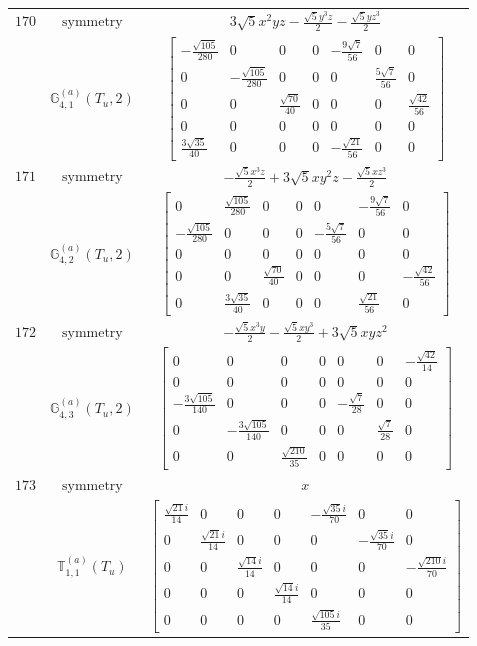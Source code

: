 \documentclass[fleqn,8pt,landscape]{jsarticle}
\begin{document}
\begin{longtable}{ccc}
$ 170 $ & $ \text{symmetry} $ & $ 3 \sqrt{5} x^{2} y z - \frac{\sqrt{5} y^{3} z}{2} - \frac{\sqrt{5} y z^{3}}{2} $ \\
$  $ & $ \mathbb{G}_{4,1}^{(a)}(T_{u},2) $ & $ \begin{bmatrix} - \frac{\sqrt{105}}{280} & 0 & 0 & 0 & - \frac{9 \sqrt{7}}{56} & 0 & 0 \\ 0 & - \frac{\sqrt{105}}{280} & 0 & 0 & 0 & \frac{5 \sqrt{7}}{56} & 0 \\ 0 & 0 & \frac{\sqrt{70}}{40} & 0 & 0 & 0 & \frac{\sqrt{42}}{56} \\ 0 & 0 & 0 & 0 & 0 & 0 & 0 \\ \frac{3 \sqrt{35}}{40} & 0 & 0 & 0 & - \frac{\sqrt{21}}{56} & 0 & 0 \end{bmatrix} $ \\ \hline
$ 171 $ & $ \text{symmetry} $ & $ - \frac{\sqrt{5} x^{3} z}{2} + 3 \sqrt{5} x y^{2} z - \frac{\sqrt{5} x z^{3}}{2} $ \\
$  $ & $ \mathbb{G}_{4,2}^{(a)}(T_{u},2) $ & $ \begin{bmatrix} 0 & \frac{\sqrt{105}}{280} & 0 & 0 & 0 & - \frac{9 \sqrt{7}}{56} & 0 \\ - \frac{\sqrt{105}}{280} & 0 & 0 & 0 & - \frac{5 \sqrt{7}}{56} & 0 & 0 \\ 0 & 0 & 0 & 0 & 0 & 0 & 0 \\ 0 & 0 & \frac{\sqrt{70}}{40} & 0 & 0 & 0 & - \frac{\sqrt{42}}{56} \\ 0 & \frac{3 \sqrt{35}}{40} & 0 & 0 & 0 & \frac{\sqrt{21}}{56} & 0 \end{bmatrix} $ \\ \hline
$ 172 $ & $ \text{symmetry} $ & $ - \frac{\sqrt{5} x^{3} y}{2} - \frac{\sqrt{5} x y^{3}}{2} + 3 \sqrt{5} x y z^{2} $ \\
$  $ & $ \mathbb{G}_{4,3}^{(a)}(T_{u},2) $ & $ \begin{bmatrix} 0 & 0 & 0 & 0 & 0 & 0 & - \frac{\sqrt{42}}{14} \\ 0 & 0 & 0 & 0 & 0 & 0 & 0 \\ - \frac{3 \sqrt{105}}{140} & 0 & 0 & 0 & - \frac{\sqrt{7}}{28} & 0 & 0 \\ 0 & - \frac{3 \sqrt{105}}{140} & 0 & 0 & 0 & \frac{\sqrt{7}}{28} & 0 \\ 0 & 0 & \frac{\sqrt{210}}{35} & 0 & 0 & 0 & 0 \end{bmatrix} $ \\ \hline
$ 173 $ & $ \text{symmetry} $ & $ x $ \\
$  $ & $ \mathbb{T}_{1,1}^{(a)}(T_{u}) $ & $ \begin{bmatrix} \frac{\sqrt{21} i}{14} & 0 & 0 & 0 & - \frac{\sqrt{35} i}{70} & 0 & 0 \\ 0 & \frac{\sqrt{21} i}{14} & 0 & 0 & 0 & - \frac{\sqrt{35} i}{70} & 0 \\ 0 & 0 & \frac{\sqrt{14} i}{14} & 0 & 0 & 0 & - \frac{\sqrt{210} i}{70} \\ 0 & 0 & 0 & \frac{\sqrt{14} i}{14} & 0 & 0 & 0 \\ 0 & 0 & 0 & 0 & \frac{\sqrt{105} i}{35} & 0 & 0 \end{bmatrix} $ \\ \hline

\end{longtable}
\end{document}
